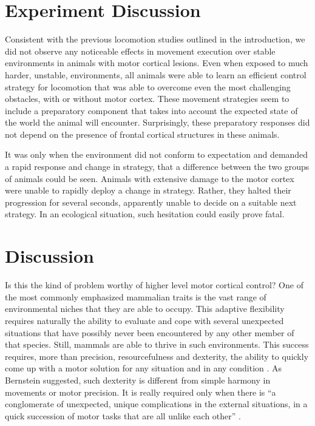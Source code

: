 \section{Experiment Discussion}

Consistent with the previous locomotion studies outlined in the introduction, we did not observe any noticeable effects in movement execution over stable environments in animals with motor cortical lesions. Even when exposed to much harder, unstable, environments, all animals were able to learn an efficient control strategy for locomotion that was able to overcome even the most challenging obstacles, with or without motor cortex. These movement strategies seem to include a preparatory component that takes into account the expected state of the world the animal will encounter. Surprisingly, these preparatory responses did not depend on the presence of frontal cortical structures in these animals.

It was only when the environment did not conform to expectation and demanded a rapid response and change in strategy, that a difference between the two groups of animals could be seen. Animals with extensive damage to the motor cortex were unable to rapidly deploy a change in strategy. Rather, they halted their progression for several seconds, apparently unable to decide on a suitable next strategy. In an ecological situation, such hesitation could easily prove fatal.

\section{Discussion}

Is this the kind of problem worthy of higher level motor cortical control? One of the most commonly emphasized mammalian traits is the vast range of environmental niches that they are able to occupy. This adaptive flexibility requires naturally the ability to evaluate and cope with several unexpected situations that have possibly never been encountered by any other member of that species. Still, mammals are able to thrive in such environments. This success requires, more than precision, resourcefulness and dexterity, the ability to quickly come up with a motor solution for any situation and in any condition \cite{Bernstein1996}. As Bernstein suggested, such dexterity is different from simple harmony in movements or motor precision. It is really required only when there is \enquote{a conglomerate of unexpected, unique complications in the external situations, in a quick succession of motor tasks that are all unlike each other} \cite{Bernstein1996}.

